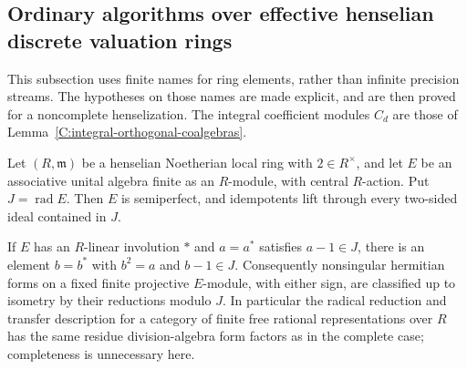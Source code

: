 \subsection{Ordinary algorithms over effective henselian discrete valuation rings}
\label{C:henselian-effective-subsection}

This subsection uses finite names for ring elements, rather than
infinite precision streams.  The hypotheses on those names are made
explicit, and are then proved for a noncomplete henselization.
The integral coefficient modules $C_d$ are those of
Lemma~\ref{C:integral-orthogonal-coalgebras}.

\begin{lemma}
\label{C:henselian-finite-algebra-lifting}
Let $(R,\mathfrak m)$ be a henselian Noetherian local ring with
$2\in R^\times$, and let $E$ be an associative unital algebra
finite as an $R$-module, with central $R$-action.  Put
$J=\operatorname{rad}E$.
Then $E$ is semiperfect, and idempotents lift through every
two-sided ideal contained in $J$.

If $E$ has an $R$-linear involution $*$ and $a=a^*$ satisfies
$a-1\in J$, there is an element $b=b^*$ with
$b^2=a$ and $b-1\in J$.  Consequently nonsingular hermitian
forms on a fixed finite projective $E$-module, with either sign,
are classified up to isometry by their reductions modulo $J$.
In particular the radical reduction and transfer description
for a category of finite free rational representations over $R$
has the same residue division-algebra form factors as in the
complete case; completeness is unnecessary here.
\end{lemma}
